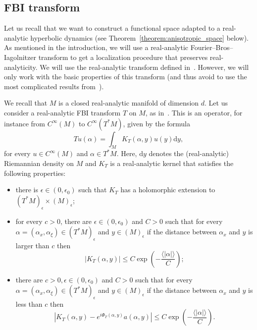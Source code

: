 \documentclass[10pt]{amsart}
\theoremstyle{definition}\newtheorem{defi}[theo]{Definition}\newtheorem{rema}[theo]{Remark}\newtheorem{exam}[theo]{Example}\newtheorem{exem}[theo]{Example}\newtheorem{nota}[theo]{Notation}
\newcommand{\p}[1]{\left(#1\right)}
\newcommand{\va}[1]{\left|#1\right|}
\newcommand{\brac}[1]{\langle #1 \rangle}
\newcommand{\rmd}{\mathrm{d}}
\begin{document}
\subsection{FBI transform}\label{subsection:FBI}

Let us recall that we want to construct a functional space adapted to a real-analytic hyperbolic dynamics (see Theorem~\ref{theorem:anisotropic_space} below). As mentioned in the introduction, we will use a real-analytic Fourier--Bros--Iagolnitzer transform to get a localization procedure that preserves real-analyticity. We will use the real-analytic transform defined in~\cite{BJ20}. However, we will only work with the basic properties of this transform (and thus avoid to use the most complicated results from~\cite{BJ20}).

We recall that $M$ is a closed real-analytic manifold of dimension $d$. Let us consider a real-analytic FBI transform $T$ on $M$, as in~\cite[Definition~2.1]{BJ20}. This is an operator, for instance from $C^\infty(M)$ to $C^\infty(T^* M)$, given by the formula
\begin{equation}\label{eq:fbi_from_kernel}
T u (\alpha) = \int_M K_T(\alpha,y) u(y) \rmd y,
\end{equation}
for every $u \in C^\infty(M)$ and $\alpha \in T^* M$. Here, $\rmd y$ denotes the (real-analytic) Riemannian density on $M$ and $K_T$ is a real-analytic kernel that satisfies the following properties:
\begin{itemize}
\item there is $\epsilon \in (0,\epsilon_0)$ such that $K_T$ has a holomorphic extension to $(T^* M)_{\epsilon} \times (M)_\epsilon$;
\item for every $c > 0$, there are $\epsilon \in (0,\epsilon_0)$ and $C > 0$ such that for every $\alpha = (\alpha_x,\alpha_\xi) \in (T^* M)_\epsilon$ and $y \in (M)_\epsilon$ if the distance between $\alpha_x$ and $y$ is larger than $c$ then
\begin{equation}\label{eq:pseudo_local}
\va{K_T(\alpha,y)} \leq C \exp\p{- \frac{\brac{\va{\alpha}}}{C}};
\end{equation}
\item there are $c > 0, \epsilon \in (0,\epsilon_0)$ and $C > 0$ such that for every $\alpha = (\alpha_x,\alpha_\xi) \in (T^* M)_\epsilon$ and $y \in (M)_\epsilon$ if the distance between $\alpha_x$ and $y$ is less than $c$ then
\begin{equation}\label{eq:local_descrption}
\va{K_T(\alpha,y) - e^{i \Phi_T(\alpha,y)} a(\alpha,y)} \leq C \exp\p{- \frac{\brac{\va{\alpha}}}{C}}.
\end{equation}
\end{itemize}
\end{document}
